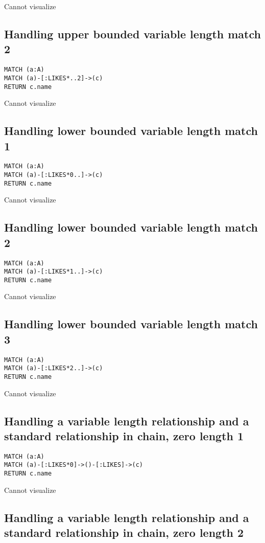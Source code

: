 Cannot visualize
\subsection{Handling upper bounded variable length match 2}

\begin{lstlisting}
MATCH (a:A)
MATCH (a)-[:LIKES*..2]->(c)
RETURN c.name
\end{lstlisting}

Cannot visualize
\subsection{Handling lower bounded variable length match 1}

\begin{lstlisting}
MATCH (a:A)
MATCH (a)-[:LIKES*0..]->(c)
RETURN c.name
\end{lstlisting}

Cannot visualize
\subsection{Handling lower bounded variable length match 2}

\begin{lstlisting}
MATCH (a:A)
MATCH (a)-[:LIKES*1..]->(c)
RETURN c.name
\end{lstlisting}

Cannot visualize
\subsection{Handling lower bounded variable length match 3}

\begin{lstlisting}
MATCH (a:A)
MATCH (a)-[:LIKES*2..]->(c)
RETURN c.name
\end{lstlisting}

Cannot visualize
\subsection{Handling a variable length relationship and a standard relationship in chain, zero length 1}

\begin{lstlisting}
MATCH (a:A)
MATCH (a)-[:LIKES*0]->()-[:LIKES]->(c)
RETURN c.name
\end{lstlisting}

Cannot visualize
\subsection{Handling a variable length relationship and a standard relationship in chain, zero length 2}


